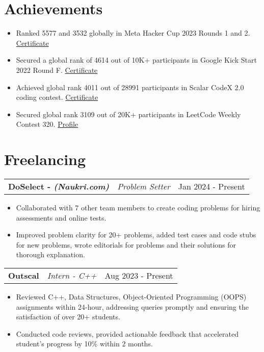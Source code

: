 \documentclass[a4paper,10pt]{article}
\makeatletter
\newenvironment{jobshort}[3]
    {
    \begin{tabularx}{\linewidth}{@{}l X r@{}}
    \textbf{#1} & \textit{#2} &  #3 \\[3pt]
    \end{tabularx}
    }
    {
    }
\newenvironment{joblong}[3]
    {
    \begin{tabularx}{\linewidth}{@{}l X r@{}}
    \textbf{#1} & \textit{#2} &  #3 \\[3pt]
    \end{tabularx}
    \begin{minipage}[t]{\linewidth}
    \begin{itemize}[nosep,after=\strut, leftmargin=1em, itemsep=2pt,label=--]
    }
    {
    \end{itemize}
    \end{minipage}    
    }
\makeatother
\begin{document}



\section{Achievements}
\vspace{-4pt}
\begin{itemize}[nosep,after=\strut, leftmargin=1em, itemsep=2pt,label=--]
    \item Ranked 5577 and 3532 globally in Meta Hacker Cup 2023 Rounds 1 and 2. \href{https://www.facebook.com/codingcompetitions/hacker-cup/2023/certificate/2037824066570201}{Certificate}
    \item Secured a global rank of 4614 out of 10K+ participants in Google Kick Start 2022 Round F. \href{https://drive.google.com/file/d/1yJX57VkI7LnC7MsX_Wz_063uCRgkH8W3/view}{Certificate}
    \item Achieved global rank 4011 out of 28991 participants in Scalar CodeX 2.0 coding contest. \href{https://moonshot.scaler.com/s/sl/p3M5EL9en3}{Certificate}
    \item Secured global rank 3109 out of 20K+ participants in LeetCode Weekly Contest 320. \href{https://leetcode.com/u/sameertri039/}{Profile}
\end{itemize}


\section{Freelancing}
\vspace{-4pt}
\begin{joblong}{DoSelect - {\footnotesize \textit{\textbf{(Naukri.com)}}}}{Problem Setter}{Jan 2024 - Present}
    \item Collaborated with 7 other team members to create coding problems for hiring assessments and online tests.
    \item Improved problem clarity for 20+ problems, added test cases and code stubs for new problems, wrote editorials for
    problems and their solutions for thorough explanation.
\end{joblong}

\begin{joblong}{Outscal}{Intern - C++}{Aug 2023 - Present}
    \item Reviewed C++, Data Structures, Object-Oriented Programming (OOPS) assignments within 24-hour, addressing
    queries promptly and ensuring the satisfaction of over 20+ students.
    \item Conducted code reviews, provided actionable feedback that accelerated student’s progress by 10\% within 2 months.
\end{joblong}
\end{document}
